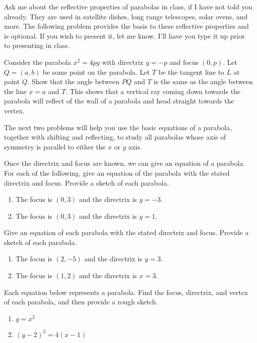 Ask me about the reflective properties of parabolas in class, if I have not told you already.  They are used in satellite dishes, long range telescopes, solar ovens, and more.  The following problem provides the basis to these reflective properties and is optional.  If you wish to present it, let me know. I'll have you type it up prior to presenting in class.

\begin{problem*}[Optional]
Consider the parabola $x^2=4py$ with directrix $y=-p$ and focus $(0,p)$. Let $Q=(a,b)$ be some point on the parabola. Let $T$ be the tangent line to $L$ at point $Q$. Show that the angle between $PQ$ and $T$ is the same as the angle between the line $x=a$ and $T$. This shows that a vertical ray coming down towards the parabola will reflect of the wall of a parabola and head straight towards the vertex.    
\end{problem*}

The next two problems will help you use the basic equations of a parabola, together with shifting and reflecting, to study all parabolas whose axis of symmetry is parallel to either the $x$ or $y$ axis. 

\begin{problem} 
%
Once the directrix and focus are known, we can give an equation of a parabola. For each of the following, give an equation of the parabola with the stated directrix and focus. Provide a sketch of each parabola.
\begin{enumerate}
\item The focus is $(0,3)$ and the directrix is $y=-3$.
\item The focus is $(0,3)$ and the directrix is $y=1$.
\end{enumerate}
\end{problem}

\begin{problem}
Give an equation of each parabola with the stated directrix and focus. Provide a sketch of each parabola.
\begin{enumerate}
\item The focus is $(2,-5)$ and the directrix is $y=3$.
\item The focus is $(1,2)$ and the directrix is $x=3$.
\end{enumerate}
\end{problem}

\begin{problem}  
%
Each equation below represents a parabola.  Find the focus, directrix, and vertex of each parabola, and then provide a rough sketch.
\begin{enumerate}
\item $y=x^2$
\item $(y-2)^2=4(x-1)$
\end{enumerate}
\end{problem}

